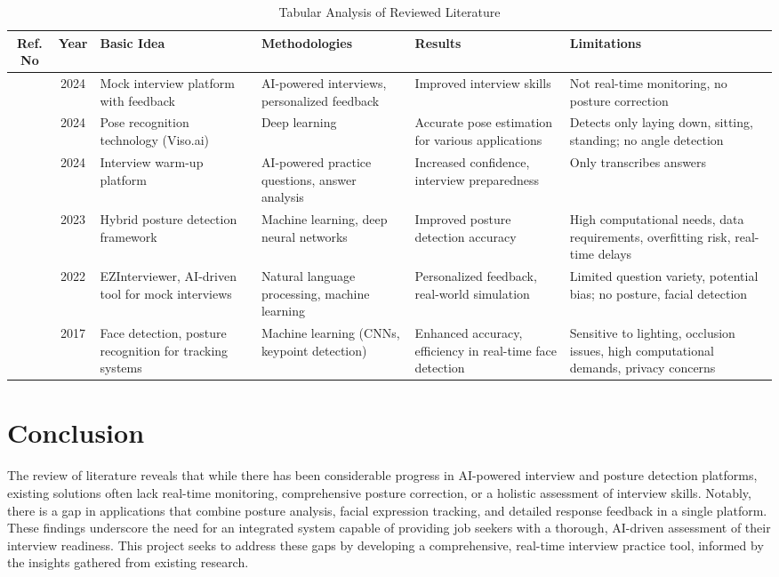 \begin{table}[h]
\centering
\begin{tabular}{|c|c|p{3.5cm}|p{3.5cm}|p{2.5cm}|p{3.5cm}|}
\hline
\textbf{Ref. No} & \textbf{Year} & \textbf{Basic Idea} & \textbf{Methodologies} & \textbf{Results} & \textbf{Limitations} \\ \hline
\cite{test} & 2024 & Mock interview platform with feedback & AI-powered interviews, personalized feedback & Improved interview skills & Not real-time monitoring, no posture correction \\ \hline
[2] & 2024 & Pose recognition technology (Viso.ai) & Deep learning & Accurate pose estimation for various applications & Detects only laying down, sitting, standing; no angle detection \\ \hline
[3] & 2024 & Interview warm-up platform & AI-powered practice questions, answer analysis & Increased confidence, interview preparedness & Only transcribes answers \\ \hline
[4] & 2023 & Hybrid posture detection framework & Machine learning, deep neural networks & Improved posture detection accuracy & High computational needs, data requirements, overfitting risk, real-time delays \\ \hline
[5] & 2022 & EZInterviewer, AI-driven tool for mock interviews & Natural language processing, machine learning & Personalized feedback, real-world simulation & Limited question variety, potential bias; no posture, facial detection \\ \hline
[6] & 2017 & Face detection, posture recognition for tracking systems & Machine learning (CNNs, keypoint detection) & Enhanced accuracy, efficiency in real-time face detection & Sensitive to lighting, occlusion issues, high computational demands, privacy concerns \\ \hline
\end{tabular}
\caption{Tabular Analysis of Reviewed Literature}
\label{tab:lit-review}
\end{table}


\section{Conclusion} The review of literature reveals that while there has been considerable progress in AI-powered interview and posture detection platforms, existing solutions often lack real-time monitoring, comprehensive posture correction, or a holistic assessment of interview skills. Notably, there is a gap in applications that combine posture analysis, facial expression tracking, and detailed response feedback in a single platform. These findings underscore the need for an integrated system capable of providing job seekers with a thorough, AI-driven assessment of their interview readiness. This project seeks to address these gaps by developing a comprehensive, real-time interview practice tool, informed by the insights gathered from existing research.


